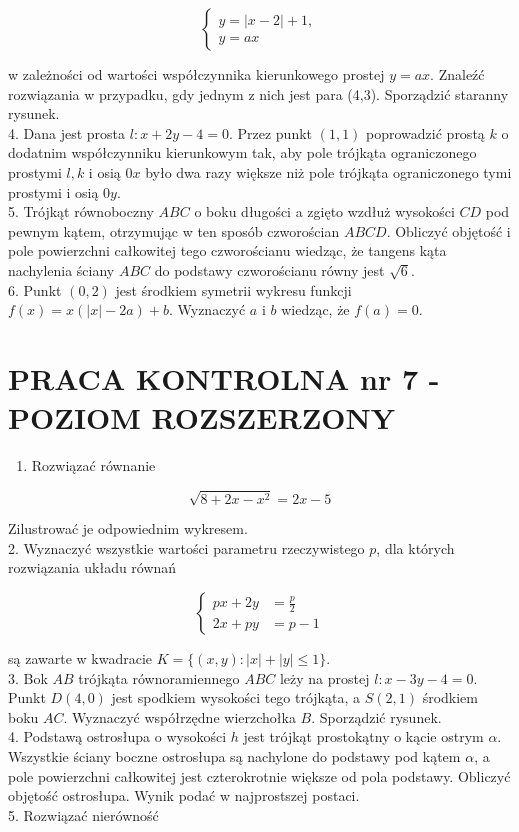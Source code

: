 \documentclass[10pt]{article}
\begin{document}
$$
\left\{\begin{array}{l}
y=|x-2|+1, \\
y=a x
\end{array}\right.
$$

w zależności od wartości współczynnika kierunkowego prostej $y=a x$. Znaleźć rozwiązania w przypadku, gdy jednym z nich jest para (4,3). Sporządzić staranny rysunek.\\
4. Dana jest prosta $l: x+2 y-4=0$. Przez punkt $(1,1)$ poprowadzić prostą $k$ o dodatnim współczynniku kierunkowym tak, aby pole trójkąta ograniczonego prostymi $l, k$ i osią $0 x$ było dwa razy większe niż pole trójkąta ograniczonego tymi prostymi i osią $0 y$.\\
5. Trójkąt równoboczny $A B C$ o boku długości a zgięto wzdłuż wysokości $C D$ pod pewnym kątem, otrzymując w ten sposób czworościan $A B C D$. Obliczyć objętość i pole powierzchni całkowitej tego czworościanu wiedząc, że tangens kąta nachylenia ściany $A B C$ do podstawy czworościanu równy jest $\sqrt{6}$.\\
6. Punkt $(0,2)$ jest środkiem symetrii wykresu funkcji $f(x)=x(|x|-2 a)+b$. Wyznaczyć $a$ i $b$ wiedząc, że $f(a)=0$.

\section*{PRACA KONTROLNA nr 7 - POZIOM ROZSZERZONY}
\begin{enumerate}
  \item Rozwiązać równanie
\end{enumerate}

$$
\sqrt{8+2 x-x^{2}}=2 x-5
$$

Zilustrować je odpowiednim wykresem.\\
2. Wyznaczyć wszystkie wartości parametru rzeczywistego $p$, dla których rozwiązania układu równań

$$
\left\{\begin{aligned}
p x+2 y & =\frac{p}{2} \\
2 x+p y & =p-1
\end{aligned}\right.
$$

są zawarte w kwadracie $K=\{(x, y):|x|+|y| \leqslant 1\}$.\\
3. Bok $A B$ trójkąta równoramiennego $A B C$ leży na prostej $l: x-3 y-4=0$. Punkt $D(4,0)$ jest spodkiem wysokości tego trójkąta, a $S(2,1)$ środkiem boku $A C$. Wyznaczyć współrzędne wierzchołka $B$. Sporządzić rysunek.\\
4. Podstawą ostrosłupa o wysokości $h$ jest trójkąt prostokątny o kącie ostrym $\alpha$. Wszystkie ściany boczne ostrosłupa są nachylone do podstawy pod kątem $\alpha$, a pole powierzchni całkowitej jest czterokrotnie większe od pola podstawy. Obliczyć objętość ostrosłupa. Wynik podać w najprostszej postaci.\\
5. Rozwiązać nierówność
\end{document}
